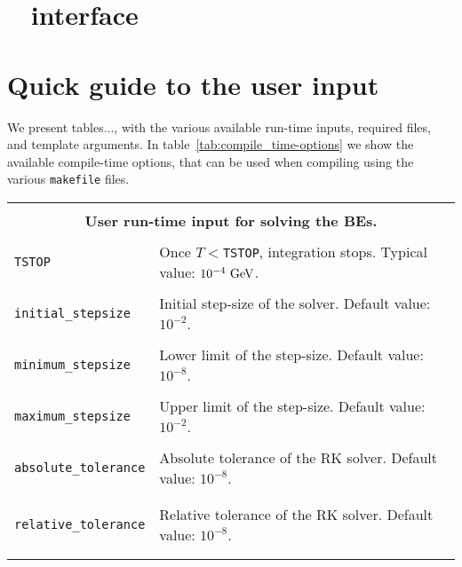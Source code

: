 \documentclass[11pt,a4paper]{article}
\begin{document}
\section{\nsc~  \PY interface}\label{app:modules}
\setcounter{equation}{0}


\section{Quick guide to the user input}\label{app:usr_input}
\setcounter{equation}{0}
We present tables..., with the various available run-time inputs, required files, and template arguments. In table~\ref{tab:compile_time-options} we show the available compile-time options, that can be used when compiling using the various {\tt makefile} files. 
%
\begin{table}[h!]
	\centering
	\begin{tabular}{l l}
		\hline\\[-0.4cm]
		\multicolumn{2}{c}{\bf User run-time input for solving the BEs.}  \\
		\hline\\[-0.4cm]


		{\tt TSTOP} & Once $T<${\tt TSTOP}, integration stops. Typical value: $10^{-4}~{\rm GeV}$.\\
		\hline\\[-0.4cm]

		{\tt initial\_stepsize} &  Initial step-size of the solver. Default value: $10^{-2}$.\\ 
		\hline\\[-0.4cm]

		{\tt minimum\_stepsize} & Lower limit of the step-size. Default value:  $10^{-8}$.\\
		\hline\\[-0.4cm]

		{\tt maximum\_stepsize} & Upper limit of the step-size. Default value:  $10^{-2}$.\\
		\hline\\[-0.4cm]

		{\tt absolute\_tolerance} & \multirow{1}{12cm}{Absolute tolerance of the RK solver.  Default value:  $10^{-8}$.}\\\\
		\hline\\[-0.4cm]

		{\tt relative\_tolerance} & \multirow{1}{12cm}{Relative tolerance of the RK solver.  Default value:  $10^{-8}$.}\\\\
		\hline\\[-0.4cm]
		

\end{tabular}
\end{table}
\end{document}
